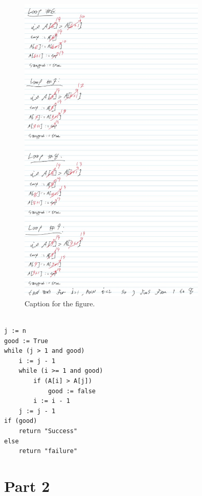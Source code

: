 \documentclass{article}
\begin{document}
\begin{figure}[h!]
    \centering
    \includegraphics[width=0.8\textwidth]{Figures/problemset2_2.jpg}
    \caption{Caption for the figure.}
    \label{fig:myfigure}
\end{figure}



\begin{verbatim}

j := n
good := True
while (j > 1 and good) 
    i := j - 1
    while (i >= 1 and good)
        if (A[i] > A[j])
            good := false
        i := i - 1
    j := j - 1
if (good)
    return "Success"
else
    return "failure"

\end{verbatim}



\newpage
\section{Part 2}
\end{document}
